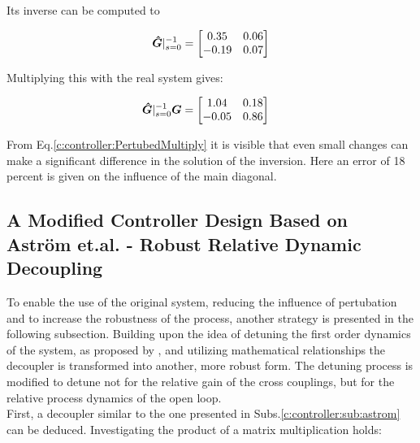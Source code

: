 Its inverse can be computed to

\begin{align}
\mbox{\boldmath$\hat{G}$}|_{s=0}^{-1} = \begin{bmatrix}
0.35 & 0.06  \\
-0.19 & 0.07
\end{bmatrix}
\end{align}

Multiplying this with the real system gives:

\begin{align}
\begin{split}
\mbox{\boldmath$\hat{G}$}|_{s=0}^{-1} \mbox{\boldmath$G$} &= \begin{bmatrix}
1.04 & 0.18 \\
-0.05 & 0.86
\end{bmatrix}
\end{split}
\label{c:controller:PertubedMultiply}
\end{align}

From Eq.\ref{c:controller:PertubedMultiply} it is visible that even small changes can make a significant difference in the solution of the inversion. Here an error of 18 percent is given on the influence of the main diagonal.\\



\subsection{A Modified Controller Design Based on Astr\"om et.al. - Robust Relative Dynamic Decoupling}
\label{c:controller:sub:modified}

To enable the use of the original system, reducing the influence of pertubation and to increase the robustness of the process, another strategy is presented in the following subsection. Building upon the idea of detuning the first order dynamics of the system, as proposed by \cite{Astrom2001a}, and utilizing mathematical relationships the decoupler is transformed into another, more robust form. The detuning process is modified to detune not for the relative gain of the cross couplings, but for the relative process dynamics of the open loop.\\

First, a decoupler similar to the one presented in Subs.\ref{c:controller:sub:astrom} can be deduced. Investigating the product of a matrix multiplication holds: 

